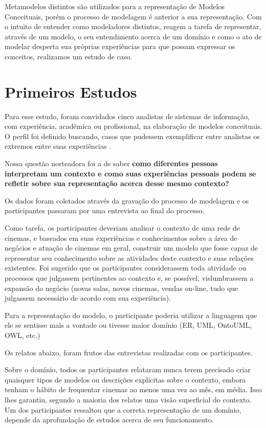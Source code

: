 Metamodelos distintos são utilizados para a representação de Modelos Conceituais, porém o processo de modelagem é anterior a sua representação. Com o intuito de entender como modeladores distintos, reagem a tarefa de representar, através de um modelo, o seu entendimento acerca de um domínio e como o ato de modelar desperta sua próprias experiências para que possam expressar os conceitos, realizamos um estudo de caso.

\section{\hspace*{3pt} Primeiros Estudos}
\label{sec:estudos}

Para esse estudo, foram convidados cinco analistas de sistemas de informação, com experiência, acadêmica ou profissional, na elaboração de modelos conceituais. O perfil foi definido buscando, casos que pudessem exemplificar entre analistas os extremos entre suas experiências \citep{wainer:2007.metodos}.

Nossa questão norteadora foi a de saber \textbf{como diferentes pessoas interpretam um contexto e como suas experiências pessoais podem se refletir sobre sua representação acerca desse mesmo contexto?}

Os dados foram coletados através da gravação do processo de modelagem e os participantes passaram por uma entrevista ao final do processo.

Como tarefa, os participantes deveriam analisar o contexto de uma rede de cinemas, e baseados em suas experiências e conhecimentos sobre a área de negócios e atuação de cinemas em geral, construir um modelo que fosse capaz de representar seu conhecimento sobre as atividades deste contexto e suas relações existentes. Foi sugerido que os participantes considerassem toda atividade ou processos que julgassem pertinentes ao contexto e, se possível, vislumbrassem a expansão do negócio (novas salas, novos cinemas, vendas on-line, tudo que julgassem necessário de acordo com sua experiência).

Para a representação do modelo, o participante poderia utilizar a linguagem que ele se sentisse mais a vontade ou tivesse maior domínio (ER, UML, OntoUML, OWL, etc.)

Os relatos abaixo, foram frutos das entrevistas realizadas com os participantes.

Sobre o domínio, todos os participantes relataram nunca terem precisado criar quaisquer tipos de modelos ou descrições explicitas sobre o contexto, embora tenham o hábito de frequentar cinemas ao menos uma vez ao mês, em média. Isso lhes garantiu, segundo a maioria dos relatos uma visão superficial do  contexto. Um dos participantes ressaltou que a correta representação de um domínio, depende da aprofundação de estudos acerca de seu funcionamento.


